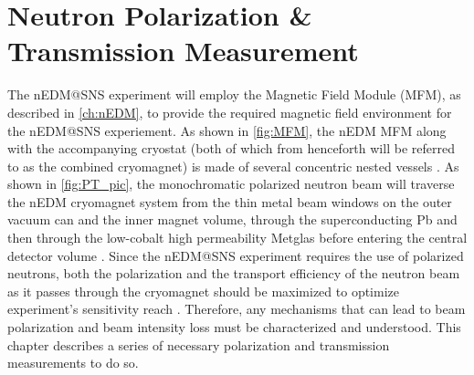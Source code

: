 \chapter{Neutron Polarization \& Transmission Measurement}
\label{ch:PT}

\ifpdf
    \graphicspath{{figures/chapter4-figs/Raster/}{figures/chapter4-figs/PDF/}{figures/chapter4-figs/}}
\else
    \graphicspath{{figures/chapter4-figs/Vector/}{figures/chapter4-figs/}}
\fi

The nEDM@SNS experiment will employ the Magnetic Field Module (MFM), as described in \cref{ch:nEDM}, to provide the required magnetic field environment for the nEDM@SNS experiement\cite{Ahmed2019}. As shown in \cref{fig:MFM}, the nEDM MFM along with the accompanying cryostat (both of which from henceforth will be referred to as the combined cryomagnet) is made of several concentric nested vessels \cite{Ahmed2019}. As shown in \cref{fig:PT_pic}, the monochromatic polarized neutron beam will traverse the nEDM cryomagnet system from the thin metal beam windows on the outer vacuum can and the inner magnet volume, through the superconducting Pb and then through the low-cobalt high permeability Metglas before entering the central detector volume \cite{Ahmed2019}. Since the nEDM@SNS experiment requires the use of polarized neutrons, both the polarization and the transport efficiency of the neutron beam as it passes through the cryomagnet should be maximized to optimize experiment's sensitivity reach \cite{Ahmed2019}. Therefore, any mechanisms that can lead to beam polarization and beam intensity loss must be characterized and understood. This chapter describes a series of necessary polarization and transmission measurements to do so.


